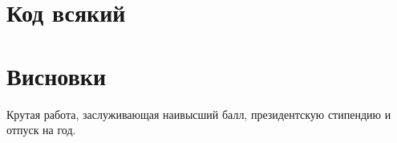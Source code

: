 \chapter{Код всякий}





\chapter*{Висновки}
Крутая работа, заслуживающая наивысший балл, президентскую стипендию
и отпуск на год.

